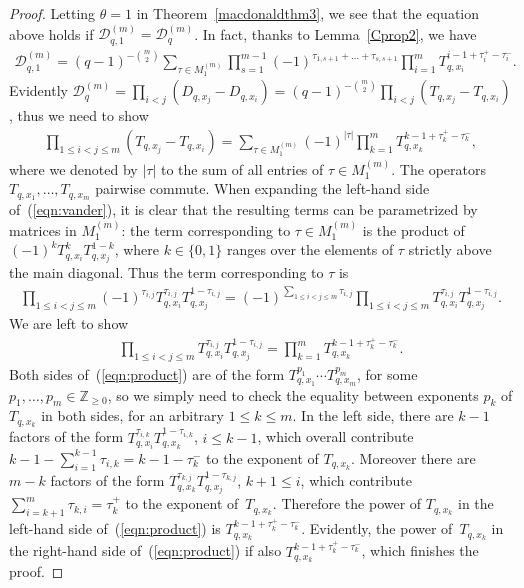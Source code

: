 \documentclass[pdftex]{sigma}
\numberwithin{equation}{section}
\newcommand{\Z}{\mathbb{Z}}
\newcommand{\DD}{\mathcal{D}}
\begin{document}
\begin{proof}
Letting $\theta = 1$ in Theorem~\ref{macdonaldthm3}, we see that the equation above holds if $\DD_{q, 1}^{(m)} = \DD_q^{(m)}$. In fact, thanks to Lemma~\ref{Cprop2}, we have
\begin{gather*}
\DD^{(m)}_{q, 1} = (q - 1)^{- {m \choose 2}}\sum_{\tau\in M^{(m)}_1}
\prod_{s = 1}^{m-1}{(-1)^{\tau_{1, s+1} + \dots + \tau_{s, s+1}}}\prod_{i = 1}^m{T_{q, x_i}^{i-1 + \tau_i^+ - \tau_i^-}}.
\end{gather*}
Evidently $\DD_q^{(m)} = \prod\limits_{i<j}{(D_{q, x_j} - D_{q, x_i})} = (q - 1)^{- {m \choose 2}}\prod\limits_{i < j}{(T_{q, x_j} - T_{q, x_i})}$, thus we need to show
\begin{gather}\label{eqn:vander}
\prod_{1\leq i < j\leq m}{(T_{q, x_j} - T_{q, x_i})} = \sum_{\tau\in M^{(m)}_1}{(-1)^{|\tau|}\prod_{k = 1}^m{T_{q, x_k}^{k - 1 + \tau_k^+ - \tau_k^- }}},
\end{gather}
where we denoted by $|\tau|$ to the sum of all entries of $\tau\in M_1^{(m)}$. The operators $T_{q, x_1}, \dots, T_{q, x_m}$ pairwise commute. When expanding the left-hand side of~(\ref{eqn:vander}), it is clear that the resulting terms can be parametrized by matrices in $M_1^{(m)}$: the term corresponding to $\tau\in M_1^{(m)}$ is the product of $(-1)^k T_{q, x_i}^k T_{q, x_j}^{1 - k}$, where $k \in \{0, 1\}$ ranges over the elements of $\tau$ strictly above the main diagonal. Thus the term corresponding to $\tau$ is
\begin{gather*}
\prod_{1\leq i < j\leq m}{(-1)^{\tau_{i, j}} T_{q, x_i}^{\tau_{i, j}} T_{q, x_j}^{1 - \tau_{i, j}}} = (-1)^{\sum\limits_{1\leq i < j\leq m}{\tau_{i, j}}}\prod_{1\leq i < j\leq m}{T_{q, x_i}^{\tau_{i, j}}T_{q, x_j}^{1 - \tau_{i, j}}}.
\end{gather*}
We are left to show
\begin{gather}\label{eqn:product}
\prod_{1\leq i < j\leq m}{T_{q, x_i}^{\tau_{i, j}}T_{q, x_j}^{1 - \tau_{i, j}}} = \prod_{k=1}^m{T_{q, x_k}^{k -1 + \tau_k^+ - \tau_k^-}}.
\end{gather}
Both sides of~(\ref{eqn:product}) are of the form $T_{q, x_1}^{p_1}\cdots T_{q, x_m}^{p_m}$, for some $p_1, \dots, p_m\in\Z_{\geq 0}$, so we simply need to check the equality between exponents $p_k$ of $T_{q, x_k}$ in both sides, for an arbitrary $1\leq k\leq m$. In the left side, there are $k - 1$ factors of the form $T_{q, x_i}^{\tau_{i, k}}T_{q, x_k}^{1 - \tau_{i, k}}$, $i\leq k - 1$, which overall contribute $k - 1 - \sum\limits_{i=1}^{k-1}{\tau_{i, k}} = k - 1 - \tau_k^-$ to the exponent of $T_{q, x_k}$. Moreover there are $m - k$ factors of the form $T_{q, x_k}^{\tau_{k, j}}T_{q, x_j}^{1 - \tau_{k, j}}$, $k+1\leq i$, which contribute $\sum\limits_{i=k+1}^m{\tau_{k, i}} = \tau_k^+$ to the exponent of~$T_{q, x_k}$. Therefore the power of $T_{q, x_k}$ in the left-hand side of~(\ref{eqn:product}) is $T_{q, x_k}^{k-1+\tau_k^+ - \tau_k^-}$. Evidently, the power of~$T_{q, x_k}$ in the right-hand side of~(\ref{eqn:product}) if also $T_{q, x_k}^{k-1+\tau_k^+ - \tau_k^-}$, which f\/inishes the proof.
\end{proof}
\end{document}
